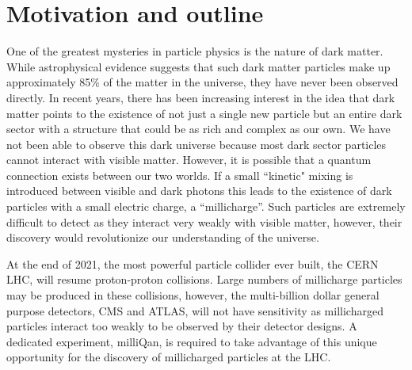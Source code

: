 \documentclass[11pt]{article}
\theoremstyle{plain} \numberwithin{equation}{section}
\theoremstyle{definition}
\begin{document}
\section*{Motivation and outline}
\noindent 

%

One of the greatest mysteries in particle physics is the nature of dark matter.
While astrophysical evidence suggests that such dark matter particles 
make up approximately 85\% of the matter
in the universe, they have never been observed directly. In recent years, 
there has been increasing interest in the idea that dark matter points to the 
existence of not just a single new particle but an entire dark sector 
with a structure that could be as rich and complex as our own. We have not been able to
observe this dark universe because most dark sector particles cannot interact with
visible matter. However, it is possible that a quantum connection exists between our two worlds. 
If a small ``kinetic" mixing is introduced between visible and dark photons this
leads to the existence of dark particles with a small electric charge, a ``millicharge''.
Such particles are extremely difficult to detect as they interact very weakly with
visible matter, however, their discovery would revolutionize our understanding
of the universe.

At the end of 2021, the most powerful particle collider ever built, the CERN LHC, 
will resume proton-proton collisions. Large numbers of millicharge particles may be 
produced in these collisions, however, the multi-billion dollar general purpose
detectors, CMS and ATLAS, will not have sensitivity as millicharged particles interact
too weakly to be observed by their detector designs. 
A dedicated experiment, milliQan, is required to take advantage of 
this unique opportunity for the discovery of millicharged particles at the LHC.
\end{document}
